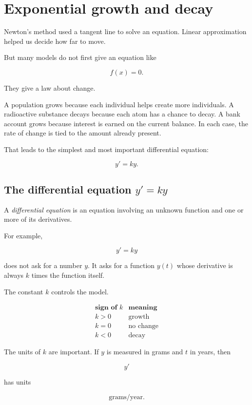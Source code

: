 \section{Exponential growth and decay}
\label{sec:exponential-growth-decay}

Newton's method used a tangent line to solve an equation.  Linear approximation
helped us decide how far to move.

But many models do not first give an equation like

\[
f(x)=0.
\]

They give a law about change.

A population grows because each individual helps create more individuals.  A
radioactive substance decays because each atom has a chance to decay.  A bank
account grows because interest is earned on the current balance.  In each case, the
rate of change is tied to the amount already present.

That leads to the simplest and most important differential equation:

\[
y'=ky.
\]

\subsection{The differential equation \(y'=ky\)}
\label{subsec:differential-equation-y-prime-ky}

A \emph{differential equation} is an equation involving an unknown function and one
or more of its derivatives.

For example,

\[
y'=ky
\]

does not ask for a number \(y\).  It asks for a function \(y(t)\) whose derivative is
always \(k\) times the function itself.

The constant \(k\) controls the model.

\[
\begin{array}{c|c}
\textbf{sign of }k & \textbf{meaning} \\ \hline
k>0 & \text{growth} \\
k=0 & \text{no change} \\
k<0 & \text{decay}
\end{array}
\]

The units of \(k\) are important.  If \(y\) is measured in grams and \(t\) in years, then

\[
y'
\]

has units

\[
\text{grams/year}.
\]

